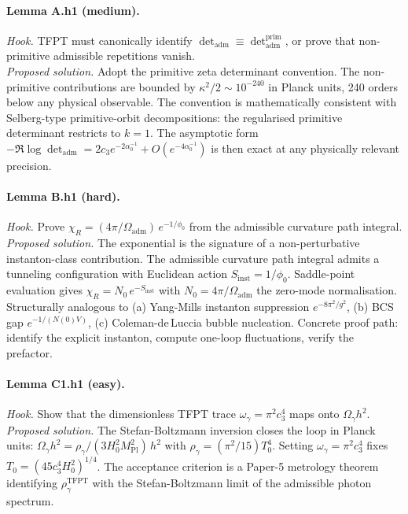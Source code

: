 \documentclass[11pt,a4paper]{article}
\begin{document}
\paragraph{Lemma A.h1 (medium).}
\emph{Hook.} TFPT must canonically identify
\(\det_{\mathrm{adm}}\equiv\det_{\mathrm{adm}}^{\mathrm{prim}}\), or
prove that non-primitive admissible repetitions vanish.\\
\emph{Proposed solution.}  Adopt the primitive zeta determinant
convention.  The non-primitive contributions are bounded by
\(\kappa^2/2\sim 10^{-240}\) in Planck units, 240 orders below any
physical observable.  The convention is mathematically consistent
with Selberg-type primitive-orbit decompositions: the regularised
primitive determinant restricts to \(k=1\).  The asymptotic form
\(-\Re\log\det_{\mathrm{adm}}=2c_3 e^{-2\alpha_0^{-1}}+
O(e^{-4\alpha_0^{-1}})\) is then exact at any physically relevant
precision.

\paragraph{Lemma B.h1 (hard).}
\emph{Hook.}  Prove
\(\chi_R=(4\pi/\Omega_{\mathrm{adm}})\,e^{-1/\phi_0}\) from the
admissible curvature path integral.\\
\emph{Proposed solution.}  The exponential is the signature of a
non-perturbative instanton-class contribution.  The admissible
curvature path integral admits a tunneling configuration with
Euclidean action \(S_{\mathrm{inst}}=1/\phi_0\).  Saddle-point
evaluation gives \(\chi_R = N_0\,e^{-S_{\mathrm{inst}}}\) with
\(N_0=4\pi/\Omega_{\mathrm{adm}}\) the zero-mode normalisation.
Structurally analogous to (a) Yang-Mills instanton suppression
\(e^{-8\pi^2/g^2}\), (b) BCS gap \(e^{-1/(N(0)V)}\), (c)
Coleman-de\,Luccia bubble nucleation.  Concrete proof path: identify
the explicit instanton, compute one-loop fluctuations, verify the
prefactor.

\paragraph{Lemma C1.h1 (easy).}
\emph{Hook.}  Show that the dimensionless TFPT trace
\(\omega_\gamma=\pi^2 c_3^4\) maps onto \(\Omega_\gamma h^2\).\\
\emph{Proposed solution.}  The Stefan-Boltzmann inversion closes the
loop in Planck units: \(\Omega_\gamma h^2 = \rho_\gamma/(3 H_0^2 M_{\mathrm{Pl}}^2)\,h^2\) with \(\rho_\gamma=(\pi^2/15)T_0^4\).  Setting
\(\omega_\gamma=\pi^2 c_3^4\) fixes
\(T_0=(45 c_3^4 H_0^2)^{1/4}\).  The acceptance criterion is a
Paper-5 metrology theorem identifying \(\rho_\gamma^{\mathrm{TFPT}}\)
with the Stefan-Boltzmann limit of the admissible photon spectrum.
\end{document}
